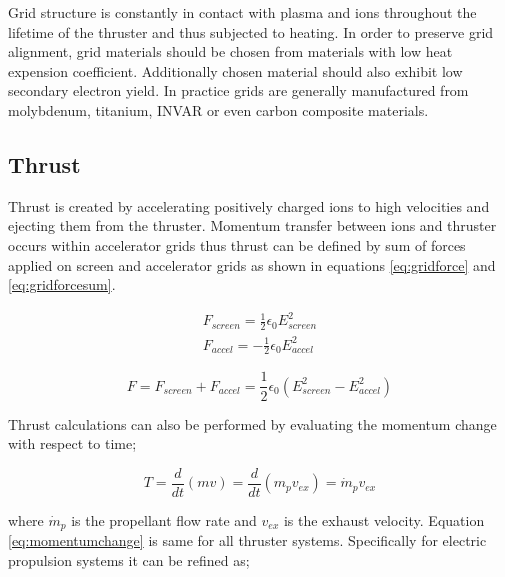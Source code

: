 Grid structure is constantly in contact with plasma and ions throughout the lifetime of the thruster and thus subjected to heating. In order to preserve grid alignment, grid materials should be chosen from materials with low heat expension coefficient. Additionally chosen material should also exhibit low secondary electron yield\cite{Bumbarger}. In practice grids are generally manufactured from molybdenum, titanium, INVAR or even carbon composite materials\cite{yavuz2013prototype}.
\subsection{Thrust} \label{ch:subsecthrust}
Thrust is created by accelerating positively charged ions to high velocities and ejecting them from the thruster. Momentum transfer between ions and thruster occurs within accelerator grids thus thrust can be defined by sum of forces applied on screen and accelerator grids\cite{Couch2017} as shown in equations \ref{eq:gridforce} and \ref{eq:gridforcesum}.

\begin{equation}
    \begin{aligned}
        F_{screen} = \frac{1}{2}\epsilon_0 E^2_{screen} \\
        F_{accel} = -\frac{1}{2}\epsilon_0 E^2_{accel} 
    \end{aligned}
\label{eq:gridforce}
\end{equation}

\begin{equation}
    F = F_{screen} + F_{accel} = \frac{1}{2}\epsilon_0 (E^2_{screen}-E^2_{accel})
    \label{eq:gridforcesum}
\end{equation}

Thrust calculations can also be performed by evaluating the momentum change with respect to time;

\begin{equation}
T = \frac{d}{dt}(mv) = \frac{d}{dt}(m_p v_{ex}) =  \dot{m}_p v_{ex}    
\label{eq:momentumchange}
\end{equation}

where $\dot{m}_p$ is the propellant flow rate and $v_{ex}$ is the exhaust velocity. Equation \ref{eq:momentumchange} is same for all thruster systems. Specifically for electric propulsion systems it can be refined as;


